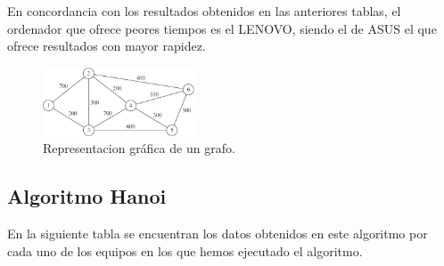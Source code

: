 \documentclass{homework}
\begin{document}
    En concordancia con los resultados obtenidos en las anteriores tablas, el ordenador que ofrece peores
    tiempos es el LENOVO, siendo el de ASUS el que ofrece resultados con mayor rapidez. 

    \begin{figure}[h]
        \centering
        \includegraphics[width=0.4\textwidth]{img/graf-floyd.jpeg}
        \caption{Representacion gráfica de un grafo.}
    \end{figure}




    
    \subsection{Algoritmo Hanoi}

    En la siguiente tabla se encuentran los datos obtenidos en este algoritmo por cada uno de los
    equipos en los que hemos ejecutado el algoritmo. 
\end{document}
